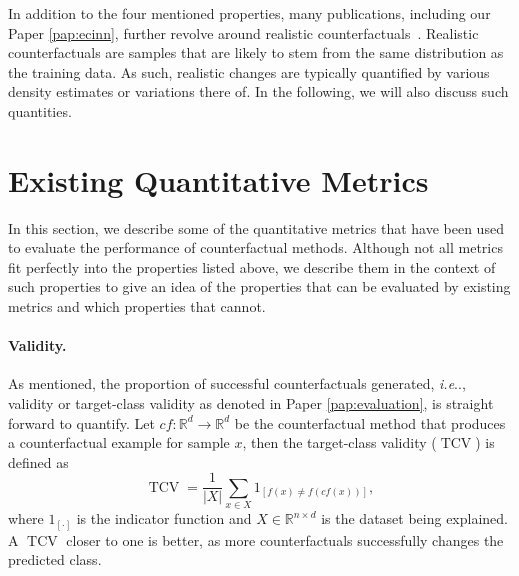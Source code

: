 \documentclass[11pt,a4paper,twoside,openright,final]{memoir}
\makeatletter
\DeclareRobustCommand\onedot{\futurelet\@let@token\@onedot}
\def\@onedot{\ifx\@let@token.\else.\null\fi\xspace}
\def\ie{\emph{i.e}\onedot} \def\Ie{\emph{I.e}\onedot}
\newcommand*{\paperref}[1]{Paper \hyperref[#1]{\ref{#1}}}
\makeatother
\begin{document}
In addition to the four mentioned properties, many publications, including our \paperref{pap:ecinn}, further revolve around realistic counterfactuals~\cite{Singla2019, flowcounterfactuals, Rodriguez2021, VanLooveren2019}. %
Realistic counterfactuals are samples that are likely to stem from the same distribution as the training data. 
As such, realistic changes are typically quantified by various density estimates or variations there of.
In the following, we will also discuss such quantities. 

\section{Existing Quantitative Metrics}  

In this section, we describe some of the quantitative metrics that have been used to evaluate the performance of counterfactual methods.
Although not all metrics fit perfectly into the properties listed above, we describe them in the context of such properties to give an idea of the properties that can be evaluated by existing metrics and which properties that cannot. 

\paragraph{Validity.}
As mentioned, the proportion of successful counterfactuals generated, \ie, validity or target-class validity as denoted in \paperref{pap:evaluation}, is straight forward to quantify.
Let $cf: \mathbb{R}^{d} \rightarrow \mathbb{R}^{d}$ be the counterfactual method that produces a counterfactual example for sample $x$, then the target-class validity ($\operatorname{TCV}$) is defined as
\begin{equation}\label{eq:tcv}
    \operatorname{TCV} = \frac{1}{|X|} \sum_{x \in X} 1_{[ f(x) \neq f( cf(x) )]}, 
\end{equation}
where $1_{[\cdot]}$ is the indicator function and $X \in \mathbb{R}^{n\times d}$ is the dataset being explained.
A $\operatorname{TCV}$ closer to one is better, as more counterfactuals successfully changes the predicted class.
\end{document}

